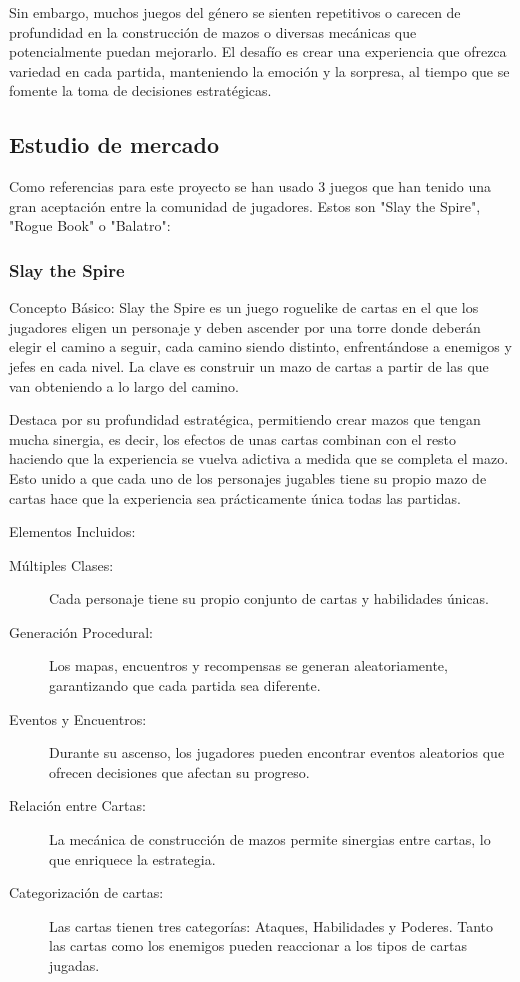 Sin embargo, muchos juegos del género se sienten repetitivos o carecen de profundidad en la construcción de mazos o diversas mecánicas que potencialmente puedan mejorarlo. El desafío es crear una experiencia que ofrezca variedad en cada partida, manteniendo la emoción y la sorpresa, al tiempo que se fomente la toma de decisiones estratégicas.

\subsection{Estudio de mercado}
Como referencias para este proyecto se han usado 3 juegos que han tenido una gran aceptación entre la comunidad de jugadores. Estos son "Slay the Spire", "Rogue Book" o "Balatro": 

\subsubsection{Slay the Spire}
Concepto Básico: Slay the Spire es un juego roguelike de cartas en el que los jugadores eligen un personaje y deben ascender por una torre donde deberán elegir el camino a seguir, cada camino siendo distinto, enfrentándose a enemigos y jefes en cada nivel. La clave es construir un mazo de cartas a partir de las que van obteniendo a lo largo del camino.

Destaca por su profundidad estratégica, permitiendo crear mazos que tengan mucha sinergia, es decir, los efectos de unas cartas combinan con el resto haciendo que la experiencia se vuelva adictiva a medida que se completa el mazo. Esto unido a que cada uno de los personajes jugables tiene su propio mazo de cartas hace que la experiencia sea prácticamente única todas las partidas.

Elementos Incluidos:
\begin{description}
    \item [Múltiples Clases:] Cada personaje tiene su propio conjunto de cartas y habilidades únicas.
    \item [Generación Procedural:] Los mapas, encuentros y recompensas se generan aleatoriamente, garantizando que cada partida sea diferente.
    \item [Eventos y Encuentros:] Durante su ascenso, los jugadores pueden encontrar eventos aleatorios que ofrecen decisiones que afectan su progreso.
    \item [Relación entre Cartas:] La mecánica de construcción de mazos permite sinergias entre cartas, lo que enriquece la estrategia.
    \item [Categorización de cartas:] Las cartas tienen tres categorías: Ataques, Habilidades y Poderes. Tanto las cartas como los enemigos pueden reaccionar a los tipos de cartas jugadas.
\end{description}

